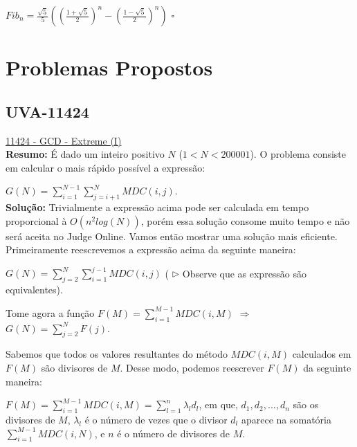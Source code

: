 $Fib_n = \frac{\sqrt{5}}{5}((\frac{1+\sqrt{5}}{2})^n - (\frac{1-\sqrt{5}}{2})^n)$ $\square$





\section{Problemas Propostos}


\subsection{UVA-11424}
\href{https://uva.onlinejudge.org/index.php?option=onlinejudge&page=show_problem&problem=2419}{11424 - GCD - Extreme (I)} \\

\textbf{Resumo:}
É dado um inteiro positivo $N$ ($1 < N < 200001$). O problema consiste em calcular o mais rápido possível a expressão:

$G(N) = \sum_{i=1}^{N-1}\sum_{j=i+1}^{N}MDC(i,j)$.
\\

\textbf{Solução:}
Trivialmente a expressão acima pode ser calculada em tempo proporcional à $O(n^2log(N))$, porém essa solução consome muito tempo e não será aceita no Judge Online. Vamos então mostrar uma solução mais eficiente.
\\

Primeiramente reescrevemos a expressão acima da seguinte maneira:

$G(N) = \sum_{j=2}^N\sum_{i=1}^{j-1}MDC(i,j)$ ( $\rhd$ Observe que as expressão são equivalentes).

Tome agora a função $F(M) = \sum_{i=1}^{M-1}MDC(i, M)$ $\Rightarrow$ $G(N) = \sum_{j=2}^NF(j)$.

Sabemos que todos os valores resultantes do método $MDC(i,M)$ calculados em $F(M)$ são divisores de $M$. Desse modo, podemos reescrever $F(M)$ da seguinte maneira:

$F(M) = \sum_{i=1}^{M-1}MDC(i, M) = \sum_{l=1}^{n}\lambda_l d_l$, em que, $d_1, d_2,..., d_n$ são os divisores de $M$, $\lambda_l$ é o número de vezes que o divisor $d_l$ aparece na somatória $\sum_{i=1}^{M-1}MDC(i,N)$, e $n$ é o número de divisores de $M$.
\\

